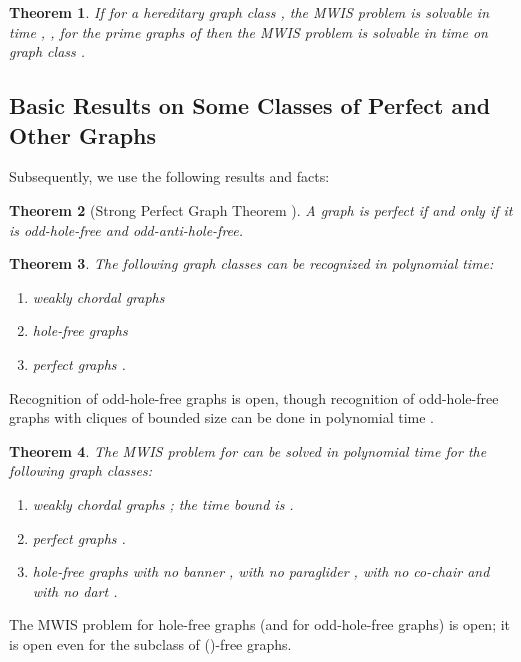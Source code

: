 \documentclass[11pt]{article}
\newcommand{\0}{\text{ has a co-join to }}
\newcommand{\1}{\text{ has a join to }}
\newtheorem{theo}{Theorem}
\begin{document}
\begin{theo}\label{MWISprimered}
If for a hereditary graph class , the MWIS problem is solvable in time , , for the prime graphs of  then the MWIS problem is solvable in time  on graph class .
\end{theo} 

\subsection{Basic Results on Some Classes of Perfect and Other Graphs}

Subsequently, we use the following results and facts:

\begin{theo}[Strong Perfect Graph Theorem \cite{ChuRobSeyTho2006}]\label{SPGT}
A graph is perfect if and only if it is odd-hole-free and odd-anti-hole-free.
\end{theo}

\begin{theo}\label{basicrecprop}
The following graph classes can be recognized in polynomial time:
\begin{enumerate}
\item[] weakly chordal graphs 
\item[] hole-free graphs  
\item[] perfect graphs .
\end{enumerate}
\end{theo}
 
Recognition of odd-hole-free graphs is open, though recognition of odd-hole-free graphs with cliques of bounded size can be done in polynomial time \cite{ConCorLiuVusZam}.
 
\begin{theo}\label{basicMWISprop}
The MWIS problem for can be solved in polynomial time for the following graph classes:
\begin{enumerate}
\item[] weakly chordal graphs ; the time bound is .
\item[] perfect graphs .
\item[] hole-free graphs with no banner , with no paraglider , with no co-chair  and with no dart \cite{BasChaKar2012}.
\end{enumerate}
\end{theo} 

The MWIS problem for hole-free graphs (and for odd-hole-free graphs) is open; it is open even for the subclass of ()-free graphs. 
\end{document}
